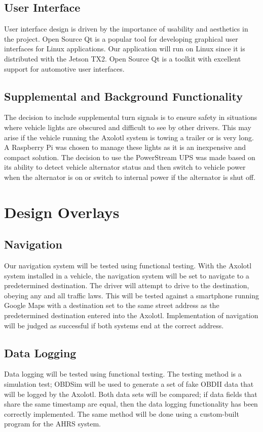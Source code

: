 \documentclass[onecolumn, draftclsnofoot,10pt, compsoc]{IEEEtran}
\begin{document}
\subsection{User Interface}
User interface design is driven by the importance of usability and aesthetics in the project. Open Source Qt is a popular tool for developing graphical user interfaces for Linux applications. Our application will run on Linux since it is distributed with the Jetson TX2. Open Source Qt is a toolkit with excellent support for automotive user interfaces.

\subsection{Supplemental and Background Functionality}
The decision to include supplemental turn signals is to ensure safety in situations where vehicle lights are obscured and difficult to see by other drivers. This may arise if the vehicle running the Axolotl system is towing a trailer or is very long. A Raspberry Pi was chosen to manage these lights as it is an inexpensive and compact solution.
The decision to use the PowerStream UPS was made based on its ability to detect vehicle alternator status and then switch to vehicle power when the alternator is on or switch to internal power if the alternator is shut off.

\newpage
\section{Design Overlays}
\subsection{Navigation}
Our navigation system will be tested using functional testing. With the Axolotl system installed in a vehicle, the navigation system will be set to navigate to a predetermined destination. The driver will attempt to drive to the destination, obeying any and all traffic laws. This will be tested against a smartphone running Google Maps with a destination set to the same street address as the predetermined destination entered into the Axolotl. Implementation of navigation will be judged as successful if both systems end at the correct address.

\subsection{Data Logging}
Data logging will be tested using functional testing. The testing method is a simulation test; OBDSim will be used to generate a set of fake OBDII data that will be logged by the Axolotl. Both data sets will be compared; if data fields that share the same timestamp are equal, then the data logging functionality has been correctly implemented. The same method will be done using a custom-built program for the AHRS system.
\end{document}
